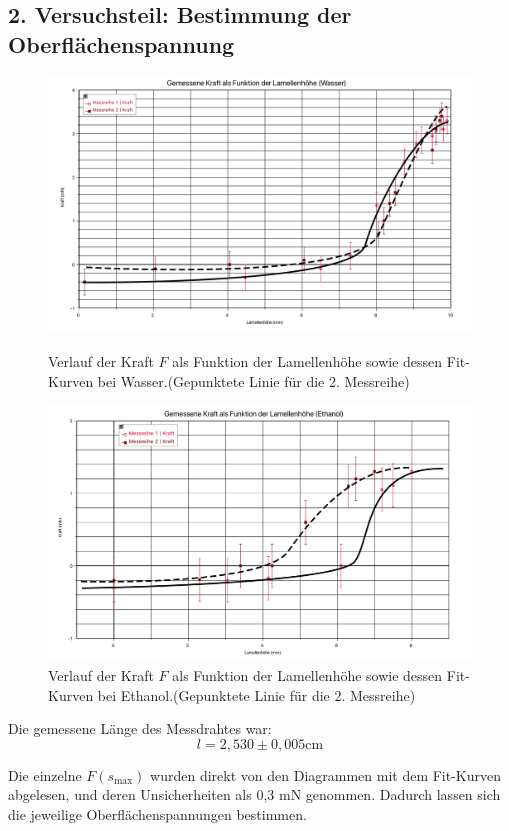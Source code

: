 \documentclass[11pt,a4paper]{article} %
\begin{document}
\subsection{2. Versuchsteil: Bestimmung der Oberflächenspannung}
\newpage
\begin{figure}[h!]
\includegraphics[width=\textwidth]{ex4gr1}
\caption{Verlauf der Kraft $F$ als Funktion der Lamellenhöhe sowie dessen Fit-Kurven bei Wasser.(Gepunktete Linie für die 2. Messreihe)}

\includegraphics[width=\textwidth]{ex4gr2}
\caption{Verlauf der Kraft $F$ als Funktion der Lamellenhöhe sowie dessen Fit-Kurven bei Ethanol.(Gepunktete Linie für die 2. Messreihe)}
\end{figure}
\newpage

Die gemessene Länge des Messdrahtes war:
$$l=2,530 \pm 0,005 \textrm{cm}$$


Die einzelne $F(s_{\textrm{max}})$ wurden direkt von den Diagrammen mit dem Fit-Kurven abgelesen, und deren Unsicherheiten als 0,3 \textrm{mN} genommen. Dadurch lassen sich die jeweilige Oberflächenspannungen bestimmen. 
\end{document}
